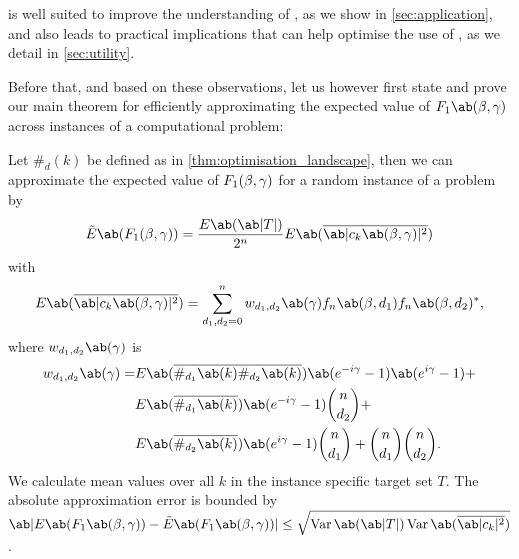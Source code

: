 is well suited to improve the understanding of \QAOA, as we show in \cref{sec:application},
and also leads to practical implications that can help
optimise the use of \QAOA, as we detail in \cref{sec:utility}.

Before that, and based on these observations, let us however first state and prove our main theorem for efficiently approximating the expected value of $F_1 \ab(\mangle, \pangle)$ across instances of a computational problem:



\begin{theorem}
  \label{thm:approx}
     Let $\#_d (k)$ be defined as in \cref{thm:optimisation_landscape}, then we can approximate the expected value of $F_1 (\beta, \gamma)$ for a random instance of a problem by
  \begin{displaymath}
      \tilde{E}\ab(F_1 (\mangle, \pangle)) = \frac{E\ab(\ab|T|)}{2^n} E\ab(\overline{\ab|c_k\ab(\mangle,\pangle)|^2})
  \end{displaymath}
  with
  \begin{equation}
      \label{eq:E_ck_mean}
      E\ab(\overline{\ab|c_k\ab(\mangle,\pangle)|^2}) = \sum_{d_1, d_2 = 0}^n w_{d_1, d_2}\ab(\pangle) f_n \ab(\mangle, d_1) f_n \ab(\mangle, d_2)^* ,
  \end{equation}
    where $w_{d_1, d_2} \ab(\pangle)$ is
  \begin{displaymath}
  \begin{aligned}
      w_{d_1, d_2}\ab(\pangle) = &E\ab(\overline{\#_{d_1}\ab(k) \#_{d_2}\ab(k)}) \ab(e^{-i\pangle} - 1)\ab(e^{i\pangle} - 1) + \\
                                 &E\ab(\overline{\#_{d_1}\ab(k)}) \ab(e^{-i \pangle} - 1) \binom{n}{d_2} + \\
                                 &E\ab(\overline{\#_{d_2}\ab(k)}) \ab(e^{i \pangle} - 1) \binom{n}{d_1} + %
                                 \binom{n}{d_1} \binom{n}{d_2}.
  \end{aligned}
  \end{displaymath}
    We calculate mean values over all $k$ in the instance specific target set $T$. The absolute approximation error is bounded by $\ab|E\ab(F_1 \ab(\mangle, \pangle)) - \tilde{E}\ab(F_1 \ab(\mangle, \pangle))| \leq \sqrt{\Var\ab(\ab|T|) \Var\ab(\overline{\ab|c_k|^2})}$.
\end{theorem}

